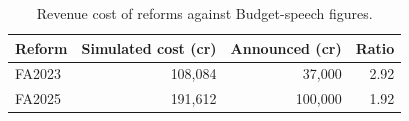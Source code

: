 \begin{table}[t]
\centering\small
\caption{Revenue cost of reforms against Budget-speech figures.}
\label{tab:backtest_reform_cost}
\begin{tabular}{lrrr}
\toprule
Reform & Simulated cost (cr) & Announced (cr) & Ratio \\
\midrule
FA2023 & 108,084 & 37,000 & 2.92 \\
FA2025 & 191,612 & 100,000 & 1.92 \\
\bottomrule
\end{tabular}
\end{table}
